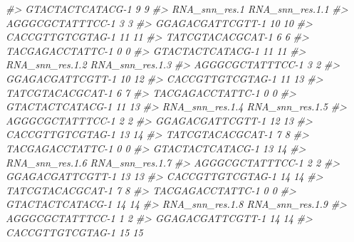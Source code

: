 \documentclass[
]{book}
\newenvironment{Shaded}{\begin{snugshade}}{\end{snugshade}}
\newcommand{\CommentTok}[1]{\textcolor[rgb]{0.56,0.35,0.01}{\textit{#1}}}
\begin{document}
\begin{Shaded}
\begin{Highlighting}[]
\CommentTok{\#\textgreater{} GTACTACTCATACG{-}1               9               9}
\CommentTok{\#\textgreater{}                  RNA\_snn\_res.1 RNA\_snn\_res.1.1}
\CommentTok{\#\textgreater{} AGGGCGCTATTTCC{-}1             3               3}
\CommentTok{\#\textgreater{} GGAGACGATTCGTT{-}1            10              10}
\CommentTok{\#\textgreater{} CACCGTTGTCGTAG{-}1            11              11}
\CommentTok{\#\textgreater{} TATCGTACACGCAT{-}1             6               6}
\CommentTok{\#\textgreater{} TACGAGACCTATTC{-}1             0               0}
\CommentTok{\#\textgreater{} GTACTACTCATACG{-}1            11              11}
\CommentTok{\#\textgreater{}                  RNA\_snn\_res.1.2 RNA\_snn\_res.1.3}
\CommentTok{\#\textgreater{} AGGGCGCTATTTCC{-}1               3               2}
\CommentTok{\#\textgreater{} GGAGACGATTCGTT{-}1              10              12}
\CommentTok{\#\textgreater{} CACCGTTGTCGTAG{-}1              11              13}
\CommentTok{\#\textgreater{} TATCGTACACGCAT{-}1               6               7}
\CommentTok{\#\textgreater{} TACGAGACCTATTC{-}1               0               0}
\CommentTok{\#\textgreater{} GTACTACTCATACG{-}1              11              13}
\CommentTok{\#\textgreater{}                  RNA\_snn\_res.1.4 RNA\_snn\_res.1.5}
\CommentTok{\#\textgreater{} AGGGCGCTATTTCC{-}1               2               2}
\CommentTok{\#\textgreater{} GGAGACGATTCGTT{-}1              12              13}
\CommentTok{\#\textgreater{} CACCGTTGTCGTAG{-}1              13              14}
\CommentTok{\#\textgreater{} TATCGTACACGCAT{-}1               7               8}
\CommentTok{\#\textgreater{} TACGAGACCTATTC{-}1               0               0}
\CommentTok{\#\textgreater{} GTACTACTCATACG{-}1              13              14}
\CommentTok{\#\textgreater{}                  RNA\_snn\_res.1.6 RNA\_snn\_res.1.7}
\CommentTok{\#\textgreater{} AGGGCGCTATTTCC{-}1               2               2}
\CommentTok{\#\textgreater{} GGAGACGATTCGTT{-}1              13              13}
\CommentTok{\#\textgreater{} CACCGTTGTCGTAG{-}1              14              14}
\CommentTok{\#\textgreater{} TATCGTACACGCAT{-}1               7               8}
\CommentTok{\#\textgreater{} TACGAGACCTATTC{-}1               0               0}
\CommentTok{\#\textgreater{} GTACTACTCATACG{-}1              14              14}
\CommentTok{\#\textgreater{}                  RNA\_snn\_res.1.8 RNA\_snn\_res.1.9}
\CommentTok{\#\textgreater{} AGGGCGCTATTTCC{-}1               1               2}
\CommentTok{\#\textgreater{} GGAGACGATTCGTT{-}1              14              14}
\CommentTok{\#\textgreater{} CACCGTTGTCGTAG{-}1              15              15}

\end{Highlighting}
\end{Shaded}
\end{document}
